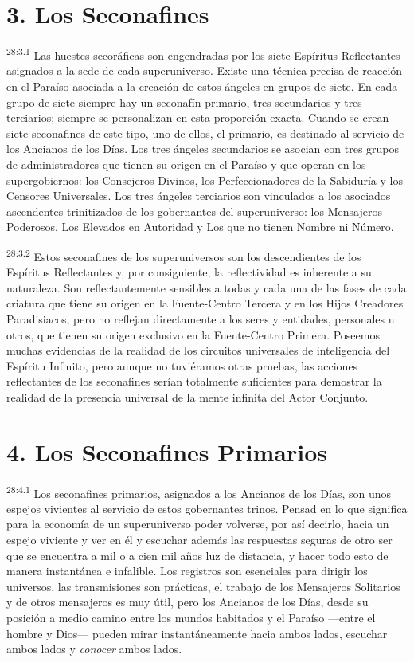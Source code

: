 \section*{3. Los Seconafines}
\par
\textsuperscript{28:3.1} Las huestes secoráficas son engendradas por los siete Espíritus Reflectantes asignados a la sede de cada superuniverso. Existe una técnica precisa de reacción en el Paraíso asociada a la creación de estos ángeles en grupos de siete. En cada grupo de siete siempre hay un seconafín primario, tres secundarios y tres terciarios; siempre se personalizan en esta proporción exacta. Cuando se crean siete seconafines de este tipo, uno de ellos, el primario, es destinado al servicio de los Ancianos de los Días. Los tres ángeles secundarios se asocian con tres grupos de administradores que tienen su origen en el Paraíso y que operan en los supergobiernos: los Consejeros Divinos, los Perfeccionadores de la Sabiduría y los Censores Universales. Los tres ángeles terciarios son vinculados a los asociados ascendentes trinitizados de los gobernantes del superuniverso: los Mensajeros Poderosos, Los Elevados en Autoridad y Los que no tienen Nombre ni Número.

\par
\textsuperscript{28:3.2} Estos seconafines de los superuniversos son los descendientes de los Espíritus Reflectantes y, por consiguiente, la reflectividad es inherente a su naturaleza. Son reflectantemente sensibles a todas y cada una de las fases de cada criatura que tiene su origen en la Fuente-Centro Tercera y en los Hijos Creadores Paradisiacos, pero no reflejan directamente a los seres y entidades, personales u otros, que tienen su origen exclusivo en la Fuente-Centro Primera. Poseemos muchas evidencias de la realidad de los circuitos universales de inteligencia del Espíritu Infinito, pero aunque no tuviéramos otras pruebas, las acciones reflectantes de los seconafines serían totalmente suficientes para demostrar la realidad de la presencia universal de la mente infinita del Actor Conjunto.

\section*{4. Los Seconafines Primarios}
\par
\textsuperscript{28:4.1} Los seconafines primarios, asignados a los Ancianos de los Días, son unos espejos vivientes al servicio de estos gobernantes trinos. Pensad en lo que significa para la economía de un superuniverso poder volverse, por así decirlo, hacia un espejo viviente y ver en él y escuchar además las respuestas seguras de otro ser que se encuentra a mil o a cien mil años luz de distancia, y hacer todo esto de manera instantánea e infalible. Los registros son esenciales para dirigir los universos, las transmisiones son prácticas, el trabajo de los Mensajeros Solitarios y de otros mensajeros es muy útil, pero los Ancianos de los Días, desde su posición a medio camino entre los mundos habitados y el Paraíso ---entre el hombre y Dios--- pueden mirar instantáneamente hacia ambos lados, escuchar ambos lados y \textit{conocer} ambos lados.

